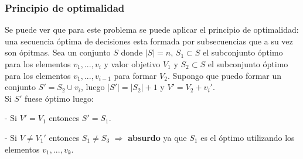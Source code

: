 \subsubsection{Principio de optimalidad}
\par Se puede ver que para este problema se puede aplicar el principio de optimalidad: una secuencia \'optima de
decisiones esta formada por subsecuencias que a su vez son \'opitmas.
Sea un conjunto $S$ donde $|S|=n$, $S_1\subset S$ el subconjunto \'optimo 
para los elementos $v_1, ... , v_i$  y valor objetivo
$V_1$ y $S_2\subset S$ el subconjunto \'optimo para los elementos $v_1, ..., v_{i-1}$ para formar $V_2$.
Supongo que puedo formar un conjunto $S' = S_2\cup {v_i}$, luego $|S'| = |S_2| + 1$ y $V'= V_2 + v_i'$.
\\ Si $S'$ fuese \'optimo luego:
\par - Si $V' = V_1$ entonces $S' = S_1$. 
\par - Si $V \neq V_1'$ entonces $S_1 \neq S_3$ $\Rightarrow$ \textbf{absurdo} ya que $S_1$ es el \'optimo utilizando
los elementos $v_1, ... ,v_k$.

